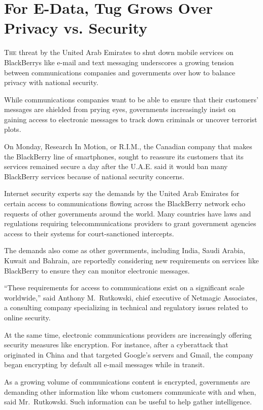 ﻿\documentclass[12pt]{article}
\begin{document}
\section{For E-Data, Tug Grows Over Privacy vs. Security}

\lettrine{T}{he} threat by the United Arab Emirates to shut down mobile
services on BlackBerrys like e-mail and text messaging underscores a growing tension between
communications companies and governments over how to balance privacy with national security.

While communications companies want to be able to ensure that their customers' messages are shielded
from prying eyes, governments increasingly insist on gaining access to electronic messages to track
down criminals or uncover terrorist plots.

On Monday, Research In Motion, or R.I.M., the Canadian company that makes the BlackBerry line of
smartphones, sought to reassure its customers that its services remained secure a day after the
U.A.E. said it would ban many BlackBerry services because of national security concerns.

Internet security experts say the demands by the United Arab Emirates for certain access to
communications flowing across the BlackBerry network echo requests of other governments around the
world. Many countries have laws and regulations requiring telecommunications providers to grant
government agencies access to their systems for court-sanctioned intercepts.

The demands also come as other governments, including India, Saudi Arabia, Kuwait and Bahrain, are
reportedly considering new requirements on services like BlackBerry to ensure they can monitor
electronic messages.

``These requirements for access to communications exist on a significant scale worldwide,'' said
Anthony M.~Rutkowski, chief executive of Netmagic Associates, a consulting company specializing in
technical and regulatory issues related to online security.

At the same time, electronic communications providers are increasingly offering security measures
like encryption. For instance, after a cyberattack that originated in China and that targeted
Google's servers and Gmail, the company began encrypting by default all e-mail messages while in
transit.

As a growing volume of communications content is encrypted, governments are demanding other
information like whom customers communicate with and when, said Mr.~Rutkowski. Such information can
be useful to help gather intelligence.
\end{document}
